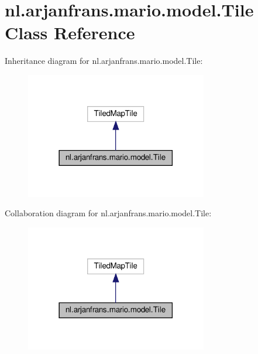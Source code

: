 \hypertarget{classnl_1_1arjanfrans_1_1mario_1_1model_1_1Tile}{}\section{nl.\+arjanfrans.\+mario.\+model.\+Tile Class Reference}
\label{classnl_1_1arjanfrans_1_1mario_1_1model_1_1Tile}


Inheritance diagram for nl.\+arjanfrans.\+mario.\+model.\+Tile\+:\nopagebreak
\begin{figure}[H]
\begin{center}
\leavevmode
\includegraphics[width=225pt]{classnl_1_1arjanfrans_1_1mario_1_1model_1_1Tile__inherit__graph}
\end{center}
\end{figure}


Collaboration diagram for nl.\+arjanfrans.\+mario.\+model.\+Tile\+:\nopagebreak
\begin{figure}[H]
\begin{center}
\leavevmode
\includegraphics[width=225pt]{classnl_1_1arjanfrans_1_1mario_1_1model_1_1Tile__coll__graph}
\end{center}
\end{figure}
